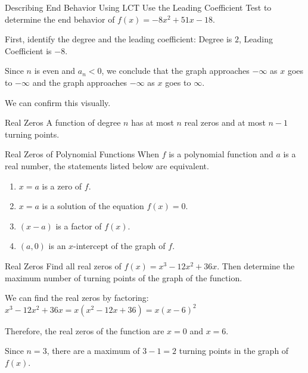 \documentclass{beamer}
\newcommand{\fp}[1]{\left({#1}\right)} %
\begin{document}
\begin{frame}[t]{Describing End Behavior Using LCT}
Use the Leading Coefficient Test to determine the end behavior of $f(x) = -8x^2 + 51x - 18$.

\pause

First, identify the degree and the leading coefficient: Degree is $2$, Leading Coefficient is $-8$.

\pause

Since $n$ is even and $a_n < 0$, we conclude that the graph approaches $-\infty$ as $x$ goes to $-\infty$ and the graph approaches $-\infty$ as $x$ goes to $\infty$.

\pause

We can confirm this visually.
\end{frame}

\begin{frame}[t]{Real Zeros}
A function of degree $n$ has at most $n$ real zeros and at most $n - 1$ turning points.

\begin{block}{Real Zeros of Polynomial Functions}
When $f$ is a polynomial function and $a$ is a real number, the statements listed below are equivalent. \begin{enumerate}
\item $x = a$ is a zero of $f$.
\item $x = a$ is a solution of the equation $f(x) = 0$.
\item $(x-a)$ is a factor of $f(x)$.
\item $(a, 0)$ is an $x$-intercept of the graph of $f$.
\end{enumerate}
\end{block}
\end{frame}

\begin{frame}[t]{Real Zeros}
Find all real zeros of $f(x) = x^3 - 12x^2 + 36x$. Then determine the maximum number of turning points of the graph of the function.

\pause

We can find the real zeros by factoring: \\
$x^3 - 12x^2 + 36x = x\fp{x^2 - 12x + 36} = x\fp{x-6}^2$

\pause

Therefore, the real zeros of the function are $x = 0$ and $x = 6$.

\pause

Since $n = 3$, there are a maximum of $3 - 1 = 2$ turning points in the graph of $f(x)$.
\end{frame}
\end{document}
